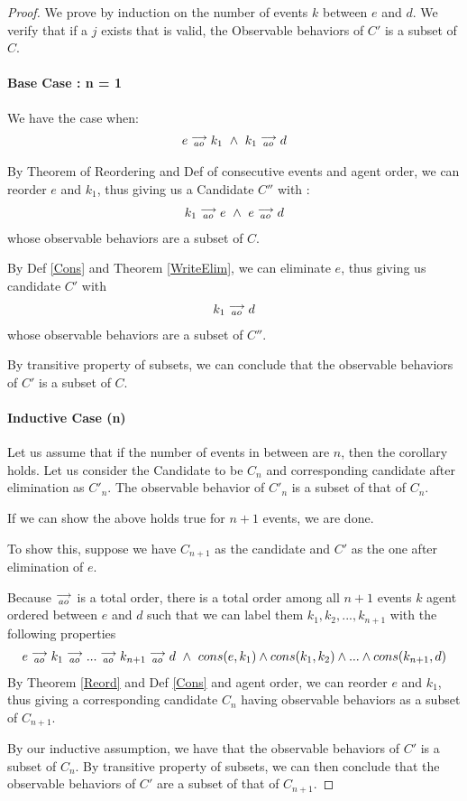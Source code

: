 \begin{proof}
    We prove by induction on the number of events $k$ between $e$ and $d$. We verify that if a $j$ exists that is valid, the Observable behaviors of $C'$ is a subset of $C$.

    \paragraph{Base Case : n = 1}

        We have the case when:
        \begin{align*}
            e\stackrel{\longrightarrow}{_{ao}}k_1 \ \wedge \ k_1\stackrel{\longrightarrow}{_{ao}}d
        \end{align*}

        By Theorem of Reordering and Def of consecutive events and agent order, we can reorder $e$ and $k_1$, thus giving us a Candidate $C''$ with :
        \begin{align*}
            k_1\stackrel{\longrightarrow}{_{ao}}e \ \wedge \ e\stackrel{\longrightarrow}{_{ao}}d
        \end{align*}  
        whose observable behaviors are a subset of $C$.

        By Def \ref{Cons} and Theorem \ref{WriteElim}, we can eliminate $e$, thus giving us candidate $C'$  with  
        \begin{align*}
            k_1\stackrel{\longrightarrow}{_{ao}}d
        \end{align*} 
        whose observable behaviors are a subset of $C''$.

        By transitive property of subsets, we can conclude that the observable behaviors of $C'$ is a subset of $C$. 
    \paragraph{Inductive Case (n)}

        Let us assume that if the number of events in between are $n$, then the corollary holds. Let us consider the Candidate to be $C_n$ and corresponding candidate after elimination as $C'_n$. The observable behavior of $C'_n$ is a subset of that of $C_n$.

        If we can show the above holds true for $n+1$ events, we are done.
        
        To show this, suppose we have $C_{n+1}$ as the candidate and $C'$ as the one after elimination of $e$. 
        
        Because $\stackrel{\longrightarrow}{_{ao}}$ is a total order, there is a total order among all $n+1$ events $k$ agent ordered between $e$ and $d$ such that we can label them $k_1, k_2 , ... , k_{n+1}$ with the following properties
        \begin{align*}
            \reln{e}{ao}{\reln{k_1}{ao}{\reln{...}{ao}{\reln{k_{n+1}}{ao}{d}}}} 
            \ \wedge \ 
            cons(e,k_1) \wedge cons(k_1, k_2) \wedge ... \wedge cons(k_{n+1}, d) 
        \end{align*}
        By Theorem \ref{Reord} and Def \ref{Cons} and agent order, we can reorder $e$ and $k_1$, thus giving a corresponding candidate $C_n$ having observable behaviors as a subset of $C_{n+1}$. 

        By our inductive assumption, we have that the observable behaviors of $C'$ is a subset of $C_n$. By transitive property of subsets, we can then conclude that the observable behaviors of $C'$ are a subset of that of $C_{n+1}$.

\end{proof}
